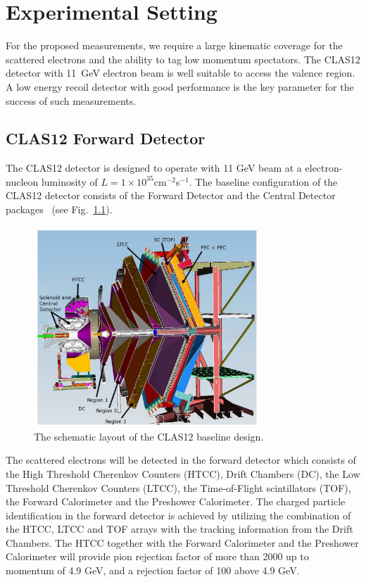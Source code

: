 \chapter{Experimental Setting}
\label{chap:setting}


For the proposed measurements, we require a large kinematic coverage for the scattered electrons and the ability to tag low momentum spectators. The CLAS12 detector with 11~GeV electron beam is well suitable to access the valence region. A low energy recoil detector with good performance is the key parameter for the success of such measurements.

\section{CLAS12 Forward Detector}
The CLAS12 detector is designed to operate with 11 GeV beam at a electron-nucleon luminosity of $L = 1\times10^{35}$cm$^{-2}$s$^{-1}$. The baseline configuration of the CLAS12 detector consists of the Forward Detector and the Central Detector packages~\cite{CD} (see Fig.~\ref{fig:fd}).

\begin{figure}
  \begin{center}
    \includegraphics[angle=0, width=0.75\textwidth]{./../Detector/fig-chap2/fd}
    \caption{The schematic layout of the CLAS12 baseline design.}
    \label{fig:fd}
  \end{center}
\end{figure}

The scattered electrons will be detected in the forward detector which consists of the High Threshold Cherenkov Counters (HTCC), Drift Chambers (DC), the Low Threshold Cherenkov Counters (LTCC), the Time-of-Flight scintillators (TOF), the Forward Calorimeter and the Preshower Calorimeter. The charged particle identification in the forward detector is achieved by utilizing the combination of the HTCC, LTCC and TOF arrays with the tracking information from the Drift Chambers. The HTCC together with the Forward Calorimeter and the Preshower Calorimeter will provide pion rejection factor of more than 2000 up to momentum of 4.9 GeV, and a rejection factor of 100 above 4.9 GeV.

